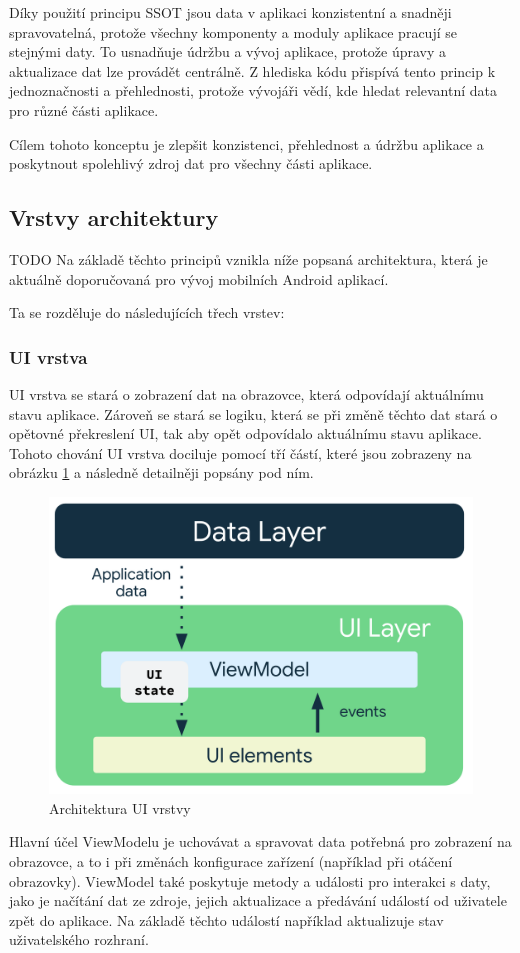 Díky použití principu SSOT jsou data v aplikaci konzistentní a snadněji spravovatelná, protože všechny komponenty a moduly aplikace pracují se stejnými 
daty. To usnadňuje údržbu a vývoj aplikace, protože úpravy a aktualizace dat lze provádět centrálně. Z hlediska kódu přispívá tento
princip k jednoznačnosti a přehlednosti, protože vývojáři vědí, kde hledat relevantní data pro různé části aplikace.

Cílem tohoto konceptu je zlepšit konzistenci, přehlednost a údržbu aplikace a poskytnout spolehlivý zdroj dat pro všechny části aplikace.


\subsection*{Vrstvy architektury} \label{vrstvyArchitekturySection} 
TODO %
Na základě těchto principů vznikla níže popsaná architektura, která je aktuálně doporučovaná pro vývoj mobilních Android aplikací.

Ta se rozděluje do následujících třech vrstev:

\subsubsection*{UI vrstva} \label{UILayerNavrh}
UI vrstva se stará o zobrazení dat na obrazovce, která odpovídají aktuálnímu stavu aplikace. Zároveň se stará se logiku, která
se při změně těchto dat stará o opětovné překreslení UI, tak aby opět odpovídalo aktuálnímu stavu aplikace. Tohoto chování UI vrstva 
dociluje pomocí tří částí, které jsou zobrazeny na obrázku \ref{fig:arch_ui_udf} a následně detailněji popsány pod ním.

\begin{figure}[H]
  \centering
  \includegraphics[width=.5\textwidth]{arch-ui-udf.png}
  \caption{Architektura UI vrstvy}
  \label{fig:arch_ui_udf}
\end{figure}

Hlavní účel ViewModelu je uchovávat a spravovat data potřebná pro zobrazení na obrazovce, a to i při změnách konfigurace zařízení 
(například při otáčení obrazovky). ViewModel také poskytuje metody a události pro interakci s daty, jako je načítání dat ze zdroje, 
jejich aktualizace a předávání událostí od uživatele zpět do aplikace. Na základě těchto událostí například aktualizuje stav uživatelského
rozhraní. %

